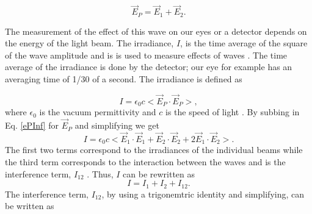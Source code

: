 \documentclass[ notitlepage, numerical, 11pt]{revtex4-1} %
\begin{document}
\begin{equation}
\vec{E}_{P} = \vec{E}_{1} + \vec{E}_{2}.
\label{ePInf}
\end{equation}

The measurement of the effect of this wave on our eyes or a detector depends on the energy of the light beam. The irradiance, $I$, is the time average of the square of the wave amplitude and is is used to measure effects of waves \cite{optics}. The time average of the irradiance is done by the detector; our eye for example has an averaging time of 1/30 of a second. The irradiance is defined as 

\begin{equation}
I = \epsilon_0 c<\vec{E}_{P}\cdot \vec{E}_{P}>,
\label{iInf}
\end{equation}
where $\epsilon_0$ is the vacuum permittivity and $c$ is the speed of light \cite{optics}. By subbing in Eq. \ref{ePInf} for $\vec{E}_{P}$ and simplifying we get 
\begin{equation}
I = \epsilon_0 c<\vec{E}_{1}\cdot \vec{E}_{1}+\vec{E}_{2}\cdot \vec{E}_{2}+2\vec{E}_{1}\cdot \vec{E}_{2}>.
\label{iInf2}
\end{equation}
The first two terms correspond to the irradiances of the individual beams while the third term corresponds to the interaction between the waves and is the interference term, $I_{12}$ \cite{optics}. Thus, $I$ can be rewritten as 
\begin{equation}
I = I_1 + I_2 + I_{12}.
\label{iInf3}
\end{equation}The interference term, $I_{12}$, by using a trigonemtric identity and simplifying, can be written as 
\end{document}
